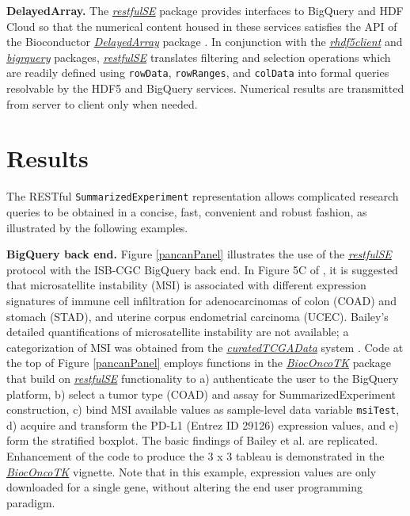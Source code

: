 \documentclass[applications]{gen-bioinformatics}
\newcommand{\Biocpackage}[1]{{\emph{\href{https://bioconductor.org/packages/3.8/#1}{#1}}}}
\newcommand{\CRANpackage}[1]{{\emph{\href{https://cran.r-project.org/web/packages/#1/index.html}{#1}}}}
\begin{document}
\noindent
\textbf{DelayedArray.}
The \Biocpackage{restfulSE} package provides interfaces to 
BigQuery and HDF Cloud so that 
the numerical content housed in these services
satisfies the API of the Bioconductor \Biocpackage{DelayedArray} package \citep{Pages2018} \citep{delarr}.  
In conjunction with the \Biocpackage{rhdf5client} \citep{rclient} and \CRANpackage{bigrquery}\citep{bigr} packages,
\Biocpackage{restfulSE} translates filtering and selection operations
which are readily defined using \verb+rowData+, \verb+rowRanges+,
and \verb+colData+ into formal queries resolvable by the HDF5 and
BigQuery services.  Numerical results are transmitted from
server to client only when needed.

\section*{Results}

The RESTful \verb+SummarizedExperiment+ representation
allows complicated research queries to be obtained in a concise,
fast, convenient and robust fashion, as illustrated by
the following examples.

\textbf{BigQuery back end.} Figure \ref{pancanPanel} illustrates the 
use of the \Biocpackage{restfulSE} protocol
with the ISB-CGC BigQuery back end.  In Figure 5C
of \citet{Bailey2018}, it is suggested that
microsatellite instability (MSI) is associated with
different expression signatures of immune cell infiltration
for adenocarcinomas of colon (COAD) and stomach (STAD), and
uterine corpus endometrial carcinoma (UCEC).  Bailey's
detailed quantifications of microsatellite instability
are not available; a categorization of MSI was
obtained from the \Biocpackage{curatedTCGAData} system \citep{Ramos2017} \citep{curTCGA}.
Code at the top of Figure \ref{pancanPanel} employs
functions in the \Biocpackage{BiocOncoTK} \citep{bionc} package that build on
\Biocpackage{restfulSE} functionality to a) authenticate the
user to the BigQuery platform, b) select a tumor
type (COAD) and assay for SummarizedExperiment
construction, c) bind MSI available values as
sample-level data variable \verb+msiTest+, d)
acquire and transform the PD-L1 
(Entrez ID 29126)
expression values, and e) form the stratified boxplot. 
The basic findings of Bailey et al. are replicated.
Enhancement of the code to produce the 3 x 3 tableau
is demonstrated in the \Biocpackage{BiocOncoTK} \citep{bionc} vignette.
Note that in this example, expression values are
only downloaded for a single gene, without altering
the end user programming paradigm.
\end{document}
